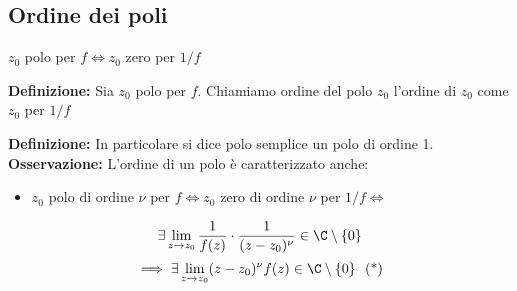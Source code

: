 \subsection{Ordine dei poli}
$z_0$ polo per $f\iff z_0$ zero per $1 / f$
\begin{tcolorbox}	
\textbf{Definizione:} Sia $z_0$ polo per $f$. Chiamiamo ordine del polo $z_0$ l'ordine di $z_0$ come $z_0$ per $1 / f$
\end{tcolorbox}
\textbf{Definizione: }In particolare si dice polo semplice un polo di ordine 1.
\textbf{Osservazione:} L'ordine di un polo è caratterizzato anche:
\begin{itemize}
	\item $z_0$ polo di ordine $\nu$ per $f \iff z_0$ zero di ordine $\nu$ per $1 / f\iff$
\end{itemize}
		\[\exists \lim_{z \to z_0} \frac{1}{f(z)}\cdot \frac{1}{(z-z_0)^\nu}\in\C\setminus \{0\}\]
		\[\implies \exists \lim_{z \to z_0} (z-z_0)^\nu f(z)\in\C\setminus \{0\} \ \text{ (*)}\]

